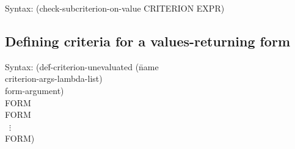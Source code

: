 {\ttfamily\begin{tabbing}
\textrm{Syntax: }(check-subcriterion-on-value CRITERION EXPR)
\end{tabbing}}
% 

\subsection{Defining criteria for a values-returning form}
\label{sec:def-criterion-unevaluated}
{\ttfamily\begin{tabbing}
\textrm{Syntax: }(de\=f-criterion-unevaluated (\=name
\\ \>            \>criterion-args-lambda-list)
\\ \>            \>form-argument)
\\ \> FORM
\\ \> FORM
\\ \> ~$\vdots$
\\ \> FORM)
\end{tabbing}}%
